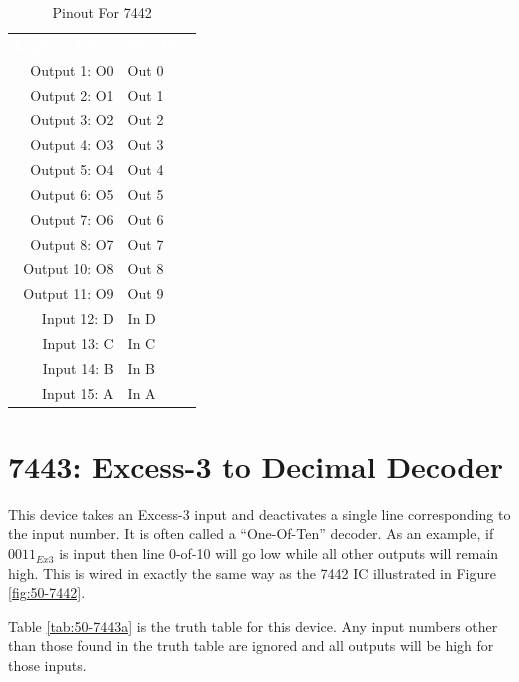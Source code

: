 \begin{table}[H]
	\sffamily
	\newcommand{\head}[1]{\textcolor{white}{\textbf{#1}}}		
	\begin{center}
		\begin{tabular}{rl} 
			\rowcolor{black!75}
			\head{Logisim Label} & \head{Function} \\
			Output 1: O0  & Out 0 \\
			Output 2: O1  & Out 1 \\
			Output 3: O2  & Out 2 \\
			Output 4: O3  & Out 3 \\
			Output 5: O4  & Out 4 \\
			Output 6: O5  & Out 5 \\
			Output 7: O6  & Out 6 \\
			Output 8: O7  & Out 7 \\
			Output 10: O8 & Out 8 \\
			Output 11: O9 & Out 9 \\
			Input 12: D   & In D  \\
			Input 13: C   & In C  \\
			Input 14: B   & In B  \\
			Input 15: A   & In A  \\
		\end{tabular}
	\end{center}
	\caption{Pinout For 7442}
	\label{tab:50-7442b}
\end{table}

\section{7443: Excess-3 to Decimal Decoder}

This device takes an Excess-3 input and deactivates a single line corresponding to the input number. It is often called a ``One-Of-Ten'' decoder. As an example, if $ 0011_{Ex3} $ is input then line 0-of-10 will go low while all other outputs will remain high. This is wired in exactly the same way as the 7442 \ac{IC} illustrated in Figure \ref{fig:50-7442}.

Table \ref{tab:50-7443a} is the truth table for this device. Any input numbers other than those found in the truth table are ignored and all outputs will be high for those inputs.

